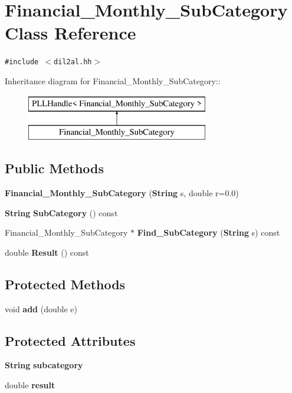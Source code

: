 \section{Financial\_\-Monthly\_\-Sub\-Category  Class Reference}
\label{classFinancial__Monthly__SubCategory}
{\tt \#include $<$dil2al.hh$>$}

Inheritance diagram for Financial\_\-Monthly\_\-Sub\-Category::\begin{figure}[H]
\begin{center}
\leavevmode
\includegraphics[height=2cm]{classFinancial__Monthly__SubCategory}
\end{center}
\end{figure}
\subsection*{Public Methods}
\begin{CompactItemize}
\item 
{\bf Financial\_\-Monthly\_\-Sub\-Category} ({\bf String} s, double r=0.0)
\item 
{\bf String} {\bf Sub\-Category} () const
\item 
Financial\_\-Monthly\_\-Sub\-Category $\ast$ {\bf Find\_\-Sub\-Category} ({\bf String} s) const
\item 
double {\bf Result} () const
\end{CompactItemize}
\subsection*{Protected Methods}
\begin{CompactItemize}
\item 
void {\bf add} (double e)
\end{CompactItemize}
\subsection*{Protected Attributes}
\begin{CompactItemize}
\item 
{\bf String} {\bf subcategory}
\item 
double {\bf result}
\end{CompactItemize}


